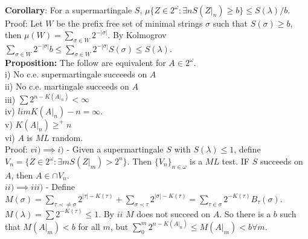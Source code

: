 \documentclass{article}
\begin{document}
	\\
	\textbf{Corollary}: For a supermartingale $S$, $\mu\{Z \in 2^\omega: \exists n S(Z|_n) \geq b\} \leq S(\lambda)/b$.\\
	Proof: Let $W$ be  the prefix free set of minimal strings $\sigma$ such that $S(\sigma) \geq b$, then $\mu(W) = \sum_{\sigma \in W} 2^{-|\sigma|}$. By Kolmogrov $\sum_{\sigma \in W} 2^{-|\sigma|}  b \leq \sum_{\sigma \in W} 2^{-|\sigma|} S(\sigma) \leq S(\lambda)$.\\
	\textbf{Proposition:} The follow are equivalent for $A \in 2^\omega$.\\
	i) No c.e. supermartingale succeeds on $A$\\
	ii) No c.e. martingale succeeds on $A$\\
	iii) $\sum 2^{n-K(A|_n)}< \infty$\\
	iv) $lim K(A|_n) -n = \infty$.\\
	v) $K(A|_n) \geq^+ n$\\
	vi) $A$ is $ML$ random.\\
	Proof: $vi) \implies i)$ - Given a supermartingale $S$ with $S(\lambda) \leq 1$, define $V_n = \{Z\in 2^\omega: \exists mS(Z|_m) > 2^n\}$. Then $\{V_n\}_{n\in \omega}$ is a $ML$ test. IF $S$ succeeds on $A$, then $A \in \cap V_n$.\\
	$ii) \implies iii)$ - Define $M(\sigma) = \sum_{\tau \prec \neq \sigma} 2^{|\tau| - K(\tau) } + \sum_{\sigma \prec \tau} 2^{|\sigma| - K(\tau)} = \sum_{\tau \in \sigma} 2^{-K(\tau)} B_\tau(\sigma)$. $M(\lambda) = \sum 2^{-K(\tau)} \leq 1$. By $ii$ $M$ does not succeed on $A$. So there is a $b$ such that $M(A|_m) < b$ for all $m$, but $\sum_0^m 2^{n-K(A|_n) }\leq M(A|_m)<b \forall m$.
\end{document}
